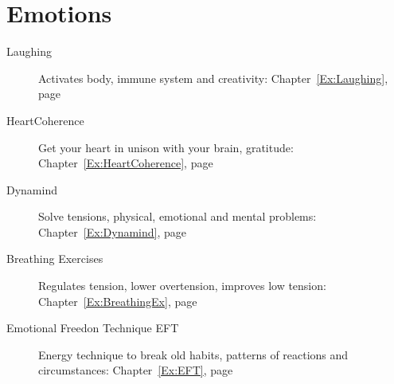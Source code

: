 \documentclass[../main.tex]{subfiles}
\begin{document}
\section{Emotions}
\begin{description}
  \item[Laughing] Activates body, immune system and creativity: Chapter~\ref{Ex:Laughing}, page ~\pageref{Ex:Laughing} %
\item[HeartCoherence] Get your heart in unison with your brain, gratitude: Chapter~\ref{Ex:HeartCoherence}, page~\pageref{Ex:HeartCoherence} %
\item[Dynamind] Solve tensions, physical, emotional and mental problems: Chap\-ter~\ref{Ex:Dynamind}, page ~\pageref{Ex:Dynamind} %
\item[Breathing Exercises] Regulates tension, lower overtension, improves low tension: Chapter~\ref{Ex:BreathingEx}, page~\pageref{Ex:BreathingEx}
  \item[Emotional Freedon Technique EFT] Energy technique to break old habits, patterns of reactions and circumstances: Chapter~\ref{Ex:EFT}, page~\pageref{Ex:EFT}
\end{description}
\end{document}
